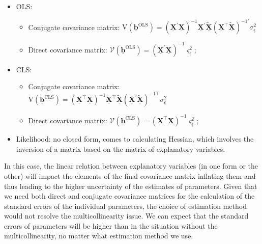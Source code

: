 \documentclass[
]{book}
\providecommand{\tightlist}{%
  \setlength{\itemsep}{0pt}\setlength{\parskip}{0pt}}
\begin{document}
\begin{itemize}
\tightlist
\item
  OLS:

  \begin{itemize}
  \tightlist
  \item
    Conjugate covariance matrix: \(\mathrm{V}\left( \underline{\boldsymbol{b}}^{\text{OLS}} \right) = \left( \underline{\mathbf{X}}^\prime \underline{\mathbf{X}} \right)^{-1} \underline{\mathbf{X}}^\prime \tilde{\underline{\mathbf{X}}} \left( {\underline{\mathbf{X}}}^\top \tilde{\underline{\mathbf{X}}} \right)^{-1 \prime} \sigma_{\underline{\epsilon}}^2\)
  \item
    Direct covariance matrix: \(\mathcal{V}\left( \underline{\boldsymbol{b}}^{\text{OLS}} \right) = \left( \underline{\mathbf{X}}^\prime \underline{\mathbf{X}} \right)^{-1} \varsigma_{\underline{\epsilon}}^2\);
  \end{itemize}
\item
  CLS:

  \begin{itemize}
  \tightlist
  \item
    Conjugate covariance matrix: \(\mathrm{V}\left( \underline{\boldsymbol{b}}^{\text{CLS}} \right) = \left( \underline{\mathbf{X}}^\top \underline{\mathbf{X}} \right)^{-1} \underline{\mathbf{X}}^\top \tilde{\underline{\mathbf{X}}} \left( {\underline{\mathbf{X}}}^\prime \tilde{\underline{\mathbf{X}}} \right)^{-1 \top} \sigma_{\underline{\epsilon}}^2\)
  \item
    Direct covariance matrix: \(\mathcal{V}\left( \underline{\boldsymbol{b}}^{\text{CLS}} \right) = \left( \underline{\mathbf{X}}^\top \underline{\mathbf{X}} \right)^{-1} \varsigma_{\underline{\epsilon}}^2\);
  \end{itemize}
\item
  Likelihood: no closed form, comes to calculating Hessian, which involves the inversion of a matrix based on the matrix of explanatory variables.
\end{itemize}

In this case, the linear relation between explanatory variables (in one form or the other) will impact the elements of the final covariance matrix inflating them and thus leading to the higher uncertainty of the estimates of parameters. Given that we need both direct and conjugate covariance matrices for the calculation of the standard errors of the individual parameters, the choice of estimation method would not resolve the multicollinearity issue. We can expect that the standard errors of parameters will be higher than in the situation without the multicollinearity, no matter what estimation method we use.
\end{document}
